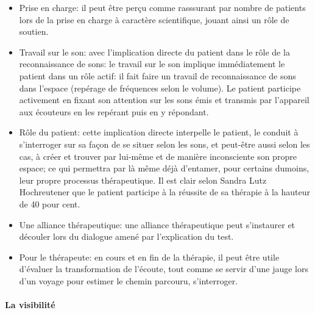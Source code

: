  \begin{itemize}

                           
\item Prise en charge: il peut être perçu comme  rasssurant  par
  nombre de patients lors de la  prise en charge à caractère scientifique, jouant ainsi un rôle de soutien.
 
   
  \item Travail sur le son:  avec l'implication directe du
     patient dans le rôle de la 
     reconnaissance de sons: le travail sur le son implique immédiatement le patient
 dans un rôle actif: il fait faire un travail de reconnaissance de sons dans
 l'espace (repérage de fréquences selon le volume). Le patient
 participe activement en fixant son attention sur les
 sons émis et transmis par l'appareil aux écouteurs en les repérant
  puis en y
  répondant.
  
  \item Rôle du patient: cette implication directe interpelle le patient, le conduit à
    s'interroger sur sa façon de 
    se situer selon les sons, et  peut-être aussi selon les cas, à
    créer et trouver par lui-même et de manière
 inconsciente  
 son propre espace; ce  qui permettra par là même déjà d'entamer, pour certains dumoins, leur propre
 processus thérapeutique. Il est clair selon Sandra Lutz Hochreutener
 que le patient participe à la réussite de sa thérapie  à la hauteur de 
 40 pour cent.
 \item Une alliance thérapeutique: une alliance thérapeutique  peut
   s'instaurer et  découler lors du
   dialogue amené par l'explication du test.
 
\item Pour le thérapeute: en cours et en fin de la thérapie, il peut
  être utile d'évaluer la transformation de l'écoute, tout
comme se servir d'une jauge  lors d'un voyage pour estimer le chemin
parcouru, s'interroger.

  
\end{itemize}

\paragraph{La visibilité}


